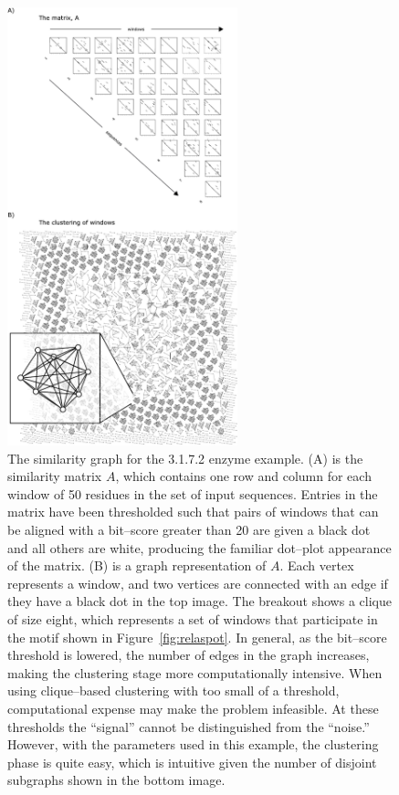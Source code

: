     \begin{figure}[ptb]
        \centering
        \includegraphics[height=5in]{Body/Images-chap3/gemoda_fig2.pdf}
        \caption[The similarity graph for the Gemoda 3.1.7.2 enzyme example]{The similarity graph for the 3.1.7.2 enzyme example.
            (A) is the similarity
            matrix $A$, which contains one row and column
            for each window of 50 residues in the
            set of input sequences.  Entries in the
            matrix have been thresholded such that
            pairs of windows that can be aligned
            with a bit--score greater than 20 are
            given a black dot and all others
            are white, producing the familiar
            dot--plot appearance of the matrix.
            (B) is a graph representation
            of $A$.  Each vertex represents a window,
            and two vertices
            are connected with an edge if
            they have a black dot in the top image.
            The breakout shows a clique of size
            eight, which represents a set of
            windows that participate in the motif
            shown in Figure~\vref{fig:relaspot}.
            In general, as the bit--score threshold
            is lowered, the number of edges
            in the graph increases, making the
            clustering stage more computationally
            intensive.  When using clique--based
            clustering with too small of a threshold,
            computational expense may make the problem
            infeasible.
            At these thresholds the
            ``signal'' cannot be distinguished
            from the ``noise.''  However, with
            the parameters used in this example,
            the clustering phase is quite easy,
            which is intuitive given the number
            of disjoint subgraphs shown in the
            bottom image.
            }\label{fig:graph}
    \end{figure}


